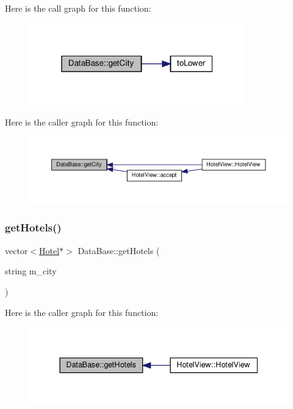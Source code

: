 Here is the call graph for this function\+:\nopagebreak
\begin{figure}[H]
\begin{center}
\leavevmode
\includegraphics[width=265pt]{class_data_base_acf702c18049dec5367c04249c8b431f7_cgraph}
\end{center}
\end{figure}
Here is the caller graph for this function\+:\nopagebreak
\begin{figure}[H]
\begin{center}
\leavevmode
\includegraphics[width=350pt]{class_data_base_acf702c18049dec5367c04249c8b431f7_icgraph}
\end{center}
\end{figure}
\mbox{\label{class_data_base_a0a4e75be22c35f5da860ce89cf264018}} 
\subsubsection{\texorpdfstring{get\+Hotels()}{getHotels()}}
{\footnotesize\ttfamily vector$<$\hyperlink{class_hotel}{Hotel}$\ast$$>$ Data\+Base\+::get\+Hotels (\begin{DoxyParamCaption}\item[{string}]{m\+\_\+city }\end{DoxyParamCaption})\hspace{0.3cm}{\ttfamily [inline]}}

Here is the caller graph for this function\+:\nopagebreak
\begin{figure}[H]
\begin{center}
\leavevmode
\includegraphics[width=337pt]{class_data_base_a0a4e75be22c35f5da860ce89cf264018_icgraph}
\end{center}
\end{figure}
\mbox{\label{class_data_base_a8e5b464d772e7cdac7c10b5548fef1b2}} 
